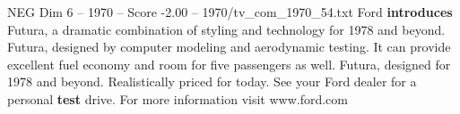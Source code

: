 \begin{textsample}{NEG Dim 6 – 1970 – Score -2.00 – 1970/tv\_com\_1970\_54.txt}  \label{ex:f6_neg_063}
Ford \textbf{introduces} Futura, a dramatic combination of styling and technology for 1978 and beyond.
Futura, designed by computer modeling and aerodynamic testing.
It can provide excellent fuel economy and room for five passengers as well.
Futura, designed for 1978 and beyond.
Realistically priced for today.
See your Ford dealer for a personal \textbf{test} drive.
For more information visit www.ford.com

\end{textsample}
